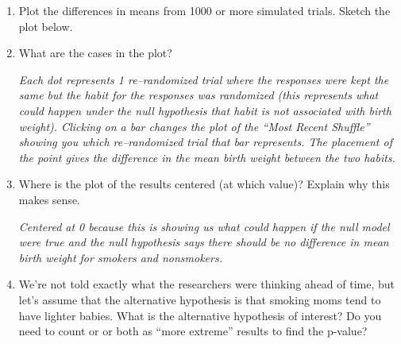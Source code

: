 \begin{enumerate}
           

{\bf Evaluate the Results }

\item  Plot the differences in means from  1000 or more simulated
  trials. Sketch the plot below.
\begin{students}
 \vspace{4cm}
\end{students}

\begin{key}
  {\it }
\end{key}



\item  What are the cases in the plot? %
\begin{students}
 \vspace{1cm}
\end{students}

\begin{key}
  {\it Each dot represents 1 re--randomized trial where the responses
   were kept the same but the habit for the responses
   was randomized (this represents what could happen under the null
   hypothesis that habit is not associated with
   birth weight).  Clicking on a bar changes the
   plot of the “Most Recent Shuffle” showing you which
   re--randomized trial that bar represents.  The placement
   of the point gives the difference in the mean birth
   weight between the two habits. }
\end{key}

   
\item  Where is the plot of the results centered (at which value)?
  Explain why this makes sense.
\begin{students}
 \vspace{3cm}
\end{students}

\begin{key}
  {\it  Centered at 0 because this is showing us what could happen if the
  null model were true and the null hypothesis says there should be
  no difference in mean birth weight for smokers and nonsmokers. }
\end{key}


\item  We're not told exactly what the researchers were thinking ahead
  of time, but let's assume that the alternative hypothesis is that
  smoking moms tend to have lighter babies.   What is the alternative
  hypothesis of interest? Do you need to count  or
   or both as ``more extreme'' results to find the p-value? 
 

\end{enumerate}
